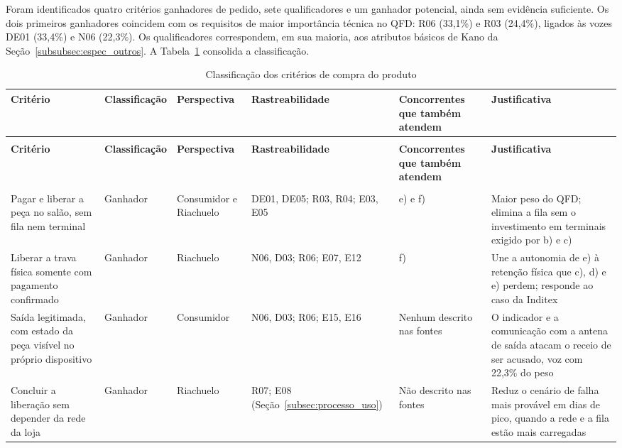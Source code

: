 Foram identificados quatro critérios ganhadores de pedido, sete qualificadores e um ganhador potencial, ainda sem evidência suficiente. Os dois primeiros ganhadores coincidem com os requisitos de maior importância técnica no QFD: R06 (33,1\%) e R03 (24,4\%), ligados às vozes DE01 (33,4\%) e N06 (22,3\%). Os qualificadores correspondem, em sua maioria, aos atributos básicos de Kano da Seção~\ref{subsubsec:espec_outros}. A Tabela~\ref{tab:ganhadores-qualificadores} consolida a classificação.

{\footnotesize
\setlength{\tabcolsep}{3pt}
\renewcommand{\arraystretch}{1.25}
\begin{longtable}{
  >{\raggedright\arraybackslash}p{3.0cm}
  >{\raggedright\arraybackslash}p{1.7cm}
  >{\raggedright\arraybackslash}p{1.7cm}
  >{\raggedright\arraybackslash}p{2.3cm}
  >{\raggedright\arraybackslash}p{1.9cm}
  >{\raggedright\arraybackslash}p{4.1cm}}
\caption{Classificação dos critérios de compra do produto}
\label{tab:ganhadores-qualificadores} \\
\toprule
\textbf{Critério} & \textbf{Classifi\-cação} & \textbf{Perspec\-tiva} & \textbf{Rastrea\-bilidade} & \textbf{Concor\-rentes que também atendem} & \textbf{Justificativa} \\
\midrule
\endfirsthead
\multicolumn{6}{l}{\textit{Tabela~\thetable\ (continuação)}} \\
\toprule
\textbf{Critério} & \textbf{Classifi\-cação} & \textbf{Perspec\-tiva} & \textbf{Rastrea\-bilidade} & \textbf{Concor\-rentes que também atendem} & \textbf{Justificativa} \\
\midrule
\endhead
\midrule
\multicolumn{6}{r}{\textit{continua na próxima página}} \\
\endfoot
\bottomrule
\endlastfoot
Pagar e liberar a peça no salão, sem fila nem terminal & Ganhador & Consumidor e Riachuelo & DE01, DE05; R03, R04; E03, E05 & e) e f) & Maior peso do QFD; elimina a fila sem o investimento em terminais exigido por b) e c) \\
Liberar a trava física somente com pagamento confirmado & Ganhador & Riachuelo & N06, D03; R06; E07, E12 & f) & Une a autonomia de e) à retenção física que c), d) e e) perdem; responde ao caso da Inditex \\
Saída legitimada, com estado da peça visível no próprio dispositivo & Ganhador & Consumidor & N06, D03; R06; E15, E16 & Nenhum descrito nas fontes & O indicador e a comunicação com a antena de saída atacam o receio de ser acusado, voz com 22,3\% do peso \\
Concluir a liberação sem depender da rede da loja & Ganhador & Riachuelo & R07; E08 (Seção~\ref{subsec:processo_uso}) & Não descrito nas fontes & Reduz o cenário de falha mais provável em dias de pico, quando a rede e a fila estão mais carregadas \\

\end{longtable}}
